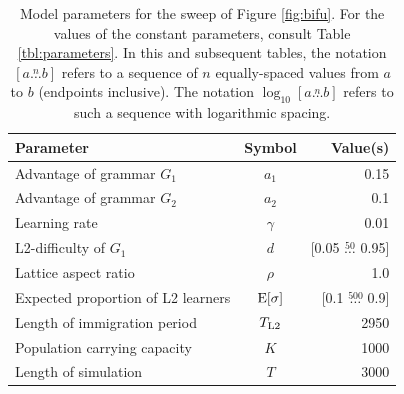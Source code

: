 \begin{table}\caption{Model parameters for the sweep of Figure \ref{fig:bifu}. For the values of the constant parameters, consult Table \ref{tbl:parameters}. In this and subsequent tables, the notation $[a \stackrel{n}{\dots} b]$ refers to a sequence of $n$ equally-spaced values from $a$ to $b$ (endpoints inclusive). The notation $\log_{10}[a \stackrel{n}{\dots} b]$ refers to such a sequence with logarithmic spacing.}\label{tbl:bifu}\begin{tabular}{lcr}
\toprule
Parameter & Symbol & Value(s) \\
\midrule
Advantage of grammar $G_1$ & $a_1$ & 0.15 \\
Advantage of grammar $G_2$ & $a_2$ & 0.1 \\
Learning rate & $\gamma$ & 0.01 \\
L2-difficulty of $G_1$ & $d$ & [0.05 $\stackrel{50}{\ldots}$ 0.95] \\
Lattice aspect ratio & $\rho$ & 1.0 \\
Expected proportion of L2 learners & $\textnormal{E}[\sigma]$ & [0.1 $\stackrel{500}{\ldots}$ 0.9] \\
Length of immigration period & $T_\textnormal{L2}$ & 2950 \\
Population carrying capacity & $K$ & 1000 \\
Length of simulation & $T$ & 3000 \\
\bottomrule
\end{tabular}
\end{table}

